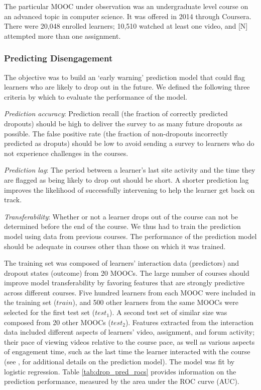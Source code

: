 \documentclass{sigchi}\usepackage[]{graphicx}\usepackage[]{color}
\begin{document}
The particular MOOC under observation was an undergraduate level course on an advanced topic in computer science. It was offered in 2014 through Coursera. There were  20,048 enrolled learners; 10,510 watched at least one video, and [N] attempted more than one assignment.

\subsubsection{Predicting Disengagement}

The objective was to build an `early warning' prediction model that could flag learners who are likely to drop out in the future. We defined the following three criteria by which to evaluate the performance of the model.

\textit{Prediction accuracy}: Prediction recall (the fraction of correctly predicted dropouts) should be high to deliver the survey to as many future dropouts as possible. The false positive rate (the fraction of non-dropouts incorrectly predicted as droputs) should be low to avoid sending a survey to learners who do not experience challenges in the courses.

\textit{Prediction lag}: The period between a learner's last site activity and the time they are flagged as being likely to drop out should be short. A shorter prediction lag improves the likelihood of successfully intervening to help the learner get back on track.

\textit{Transferability}: Whether or not a learner drops out of the course can not be determined before the end of the course. We thus had to train the prediction model using data from previous courses. The performance of the prediction model should be adequate in courses other than those on which it was trained.

The training set was composed of learners' interaction data (predictors) and dropout states (outcome) from 20 MOOCs. The large number of courses should improve model transferability by favoring features that are strongly predictive across different courses. Five hundred learners from each MOOC were included in the training set ($train$), and 500 other learners from the same MOOCs were selected for the first test set ($test_1$). A second test set of similar size was composed from 20 other MOOCs ($test_2$). Features extracted from the interaction data included different aspects of learners' video, assignment, and forum activity; their pace of viewing videos relative to the course pace, as well as various aspects of engagement time, such as the last time the learner interacted with the course (see \cite{halawa2014dropout}, for additional details on the prediction model). The model was fit by logistic regression. Table \ref{tab:drop_pred_rocs} provides information on the prediction performance, measured by the area under the ROC curve (AUC).
\end{document}
